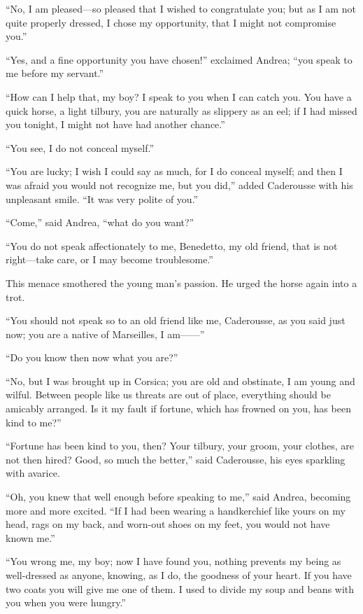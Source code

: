 “No, I am pleased—so pleased that I wished to congratulate you; but as
I am not quite properly dressed, I chose my opportunity, that I might
not compromise you.”

“Yes, and a fine opportunity you have chosen!” exclaimed Andrea; “you
speak to me before my servant.”

“How can I help that, my boy? I speak to you when I can catch you. You
have a quick horse, a light tilbury, you are naturally as slippery as
an eel; if I had missed you tonight, I might not have had another
chance.”

“You see, I do not conceal myself.”

“You are lucky; I wish I could say as much, for I do conceal myself;
and then I was afraid you would not recognize me, but you did,” added
Caderousse with his unpleasant smile. “It was very polite of you.”

“Come,” said Andrea, “what do you want?”

“You do not speak affectionately to me, Benedetto, my old friend, that
is not right—take care, or I may become troublesome.”

This menace smothered the young man’s passion. He urged the horse again
into a trot.

“You should not speak so to an old friend like me, Caderousse, as you
said just now; you are a native of Marseilles, I am——”

“Do you know then now what you are?”

“No, but I was brought up in Corsica; you are old and obstinate, I am
young and wilful. Between people like us threats are out of place,
everything should be amicably arranged. Is it my fault if fortune,
which has frowned on you, has been kind to me?”

“Fortune has been kind to you, then? Your tilbury, your groom, your
clothes, are not then hired? Good, so much the better,” said
Caderousse, his eyes sparkling with avarice.

“Oh, you knew that well enough before speaking to me,” said Andrea,
becoming more and more excited. “If I had been wearing a handkerchief
like yours on my head, rags on my back, and worn-out shoes on my feet,
you would not have known me.”

“You wrong me, my boy; now I have found you, nothing prevents my being
as well-dressed as anyone, knowing, as I do, the goodness of your
heart. If you have two coats you will give me one of them. I used to
divide my soup and beans with you when you were hungry.”

